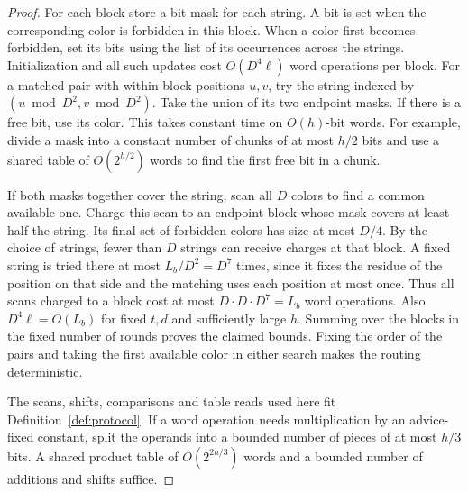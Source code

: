\begin{proof}
For each block store a bit mask for each string.  A bit is set when the
corresponding color is forbidden in this block.  When a color first
becomes forbidden, set its bits using the list of its occurrences across
the strings.  Initialization and all such updates cost $O(D^4\ell)$
word operations per block.  For a matched pair with within-block
positions $u,v$, try the string indexed by
$(u\bmod D^2,v\bmod D^2)$.  Take the union of its two endpoint masks.
If there is a free bit, use its color.  This takes constant time on
$O(h)$-bit words.  For example, divide a mask into a constant number of
chunks of at most $h/2$ bits and use a shared table of $O(2^{h/2})$
words to find the first free bit in a chunk.

If both masks together cover the string, scan all $D$ colors to find a
common available one.  Charge this scan to an endpoint block whose mask
covers at least half the string.  Its final set of forbidden colors has
size at most $D/4$.  By the choice of strings, fewer than $D$ strings
can receive charges at that block.  A fixed string is tried there at
most $L_b/D^2=D^7$ times, since it fixes the residue of the position
on that side and the matching uses each position at most once.  Thus all
scans charged to a block cost at most $D\cdot D\cdot D^7=L_b$ word
operations.  Also $D^4\ell=O(L_b)$ for fixed $t,d$ and sufficiently
large $h$.  Summing over the blocks in the fixed number of rounds proves
the claimed bounds.  Fixing the order of the pairs and taking the first
available color in either search makes the routing deterministic.

The scans, shifts, comparisons and table reads used here fit
Definition~\ref{def:protocol}. If a word operation needs multiplication
by an advice-fixed constant, split the operands into a bounded number of
pieces of at most $h/3$ bits. A shared product table of $O(2^{2h/3})$
words and a bounded number of additions and shifts suffice.
\end{proof}
